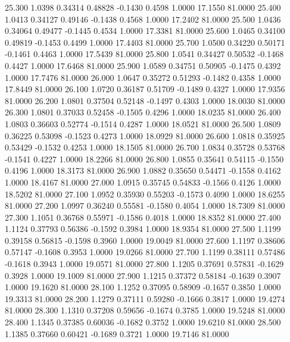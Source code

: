   25.300   1.0398   0.34314   0.48828  -0.1430   0.4598   1.0000  17.1550  81.0000
  25.400   1.0413   0.34127   0.49146  -0.1438   0.4568   1.0000  17.2402  81.0000
  25.500   1.0436   0.34064   0.49477  -0.1445   0.4534   1.0000  17.3381  81.0000
  25.600   1.0465   0.34100   0.49819  -0.1453   0.4499   1.0000  17.4403  81.0000
  25.700   1.0500   0.34220   0.50171  -0.1461   0.4463   1.0000  17.5439  81.0000
  25.800   1.0541   0.34427   0.50532  -0.1468   0.4427   1.0000  17.6468  81.0000
  25.900   1.0589   0.34751   0.50905  -0.1475   0.4392   1.0000  17.7476  81.0000
  26.000   1.0647   0.35272   0.51293  -0.1482   0.4358   1.0000  17.8449  81.0000
  26.100   1.0720   0.36187   0.51709  -0.1489   0.4327   1.0000  17.9356  81.0000
  26.200   1.0801   0.37504   0.52148  -0.1497   0.4303   1.0000  18.0030  81.0000
  26.300   1.0801   0.37033   0.52458  -0.1505   0.4296   1.0000  18.0235  81.0000
  26.400   1.0803   0.36603   0.52774  -0.1514   0.4287   1.0000  18.0521  81.0000
  26.500   1.0809   0.36225   0.53098  -0.1523   0.4273   1.0000  18.0929  81.0000
  26.600   1.0818   0.35925   0.53429  -0.1532   0.4253   1.0000  18.1505  81.0000
  26.700   1.0834   0.35728   0.53768  -0.1541   0.4227   1.0000  18.2266  81.0000
  26.800   1.0855   0.35641   0.54115  -0.1550   0.4196   1.0000  18.3173  81.0000
  26.900   1.0882   0.35650   0.54471  -0.1558   0.4162   1.0000  18.4167  81.0000
  27.000   1.0915   0.35745   0.54833  -0.1566   0.4126   1.0000  18.5202  81.0000
  27.100   1.0952   0.35930   0.55203  -0.1573   0.4090   1.0000  18.6255  81.0000
  27.200   1.0997   0.36240   0.55581  -0.1580   0.4054   1.0000  18.7309  81.0000
  27.300   1.1051   0.36768   0.55971  -0.1586   0.4018   1.0000  18.8352  81.0000
  27.400   1.1124   0.37793   0.56386  -0.1592   0.3984   1.0000  18.9354  81.0000
  27.500   1.1199   0.39158   0.56815  -0.1598   0.3960   1.0000  19.0049  81.0000
  27.600   1.1197   0.38606   0.57147  -0.1608   0.3953   1.0000  19.0266  81.0000
  27.700   1.1199   0.38111   0.57486  -0.1618   0.3943   1.0000  19.0571  81.0000
  27.800   1.1205   0.37691   0.57831  -0.1629   0.3928   1.0000  19.1009  81.0000
  27.900   1.1215   0.37372   0.58184  -0.1639   0.3907   1.0000  19.1620  81.0000
  28.100   1.1252   0.37095   0.58909  -0.1657   0.3850   1.0000  19.3313  81.0000
  28.200   1.1279   0.37111   0.59280  -0.1666   0.3817   1.0000  19.4274  81.0000
  28.300   1.1310   0.37208   0.59656  -0.1674   0.3785   1.0000  19.5248  81.0000
  28.400   1.1345   0.37385   0.60036  -0.1682   0.3752   1.0000  19.6210  81.0000
  28.500   1.1385   0.37660   0.60421  -0.1689   0.3721   1.0000  19.7146  81.0000

